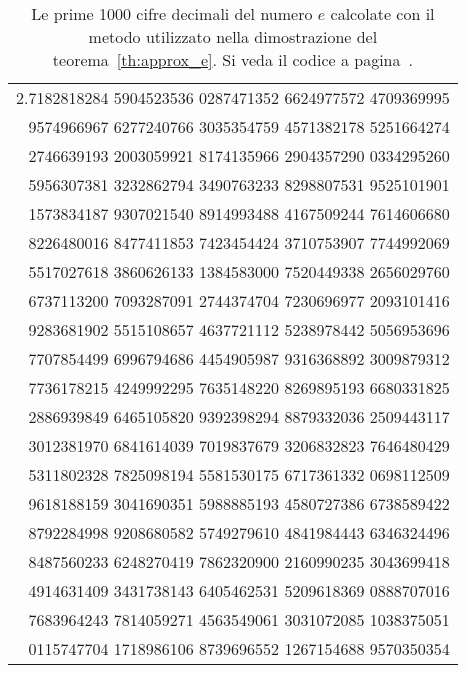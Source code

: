 \begin{table}
\begin{center}
\begin{tabular}{r}
\ttfamily\footnotesize 2.7182818284 5904523536 0287471352 6624977572 4709369995 \\
\ttfamily\footnotesize   9574966967 6277240766 3035354759 4571382178 5251664274 \\
\ttfamily\footnotesize   2746639193 2003059921 8174135966 2904357290 0334295260 \\
\ttfamily\footnotesize   5956307381 3232862794 3490763233 8298807531 9525101901 \\
\ttfamily\footnotesize   1573834187 9307021540 8914993488 4167509244 7614606680 \\
\ttfamily\footnotesize   8226480016 8477411853 7423454424 3710753907 7744992069 \\
\ttfamily\footnotesize   5517027618 3860626133 1384583000 7520449338 2656029760 \\
\ttfamily\footnotesize   6737113200 7093287091 2744374704 7230696977 2093101416 \\
\ttfamily\footnotesize   9283681902 5515108657 4637721112 5238978442 5056953696 \\
\ttfamily\footnotesize   7707854499 6996794686 4454905987 9316368892 3009879312 \\
\ttfamily\footnotesize   7736178215 4249992295 7635148220 8269895193 6680331825 \\
\ttfamily\footnotesize   2886939849 6465105820 9392398294 8879332036 2509443117 \\
\ttfamily\footnotesize   3012381970 6841614039 7019837679 3206832823 7646480429 \\
\ttfamily\footnotesize   5311802328 7825098194 5581530175 6717361332 0698112509 \\
\ttfamily\footnotesize   9618188159 3041690351 5988885193 4580727386 6738589422 \\
\ttfamily\footnotesize   8792284998 9208680582 5749279610 4841984443 6346324496 \\
\ttfamily\footnotesize   8487560233 6248270419 7862320900 2160990235 3043699418 \\
\ttfamily\footnotesize   4914631409 3431738143 6405462531 5209618369 0888707016 \\
\ttfamily\footnotesize   7683964243 7814059271 4563549061 3031072085 1038375051 \\
\ttfamily\footnotesize   0115747704 1718986106 8739696552 1267154688 9570350354
\end{tabular}
\end{center}
\caption{Le prime 1000 cifre decimali del numero $e$
calcolate con il metodo utilizzato nella dimostrazione
del teorema~\ref{th:approx_e}.
Si veda il codice a pagina~\pageref{code:compute_e}.}
\label{fig:cifre_e}
\end{table}

